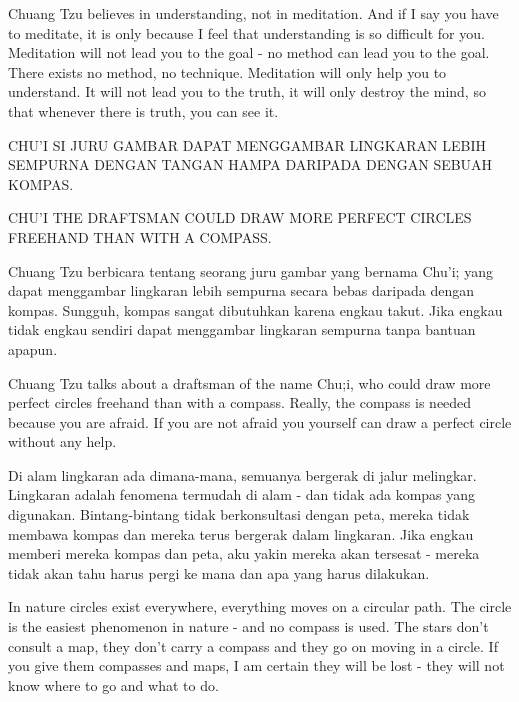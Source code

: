 \english
Chuang Tzu believes in understanding, not in meditation. And if I say you have to meditate, it is only because I feel that understanding is so difficult for you. Meditation will not lead you to the goal - no method can lead you to the goal. There exists no method, no technique. Meditation will only help you to understand. It will not lead you to the truth, it will only destroy the mind, so that whenever there is truth, you can see it.

\bahasa
CHU'I SI JURU GAMBAR DAPAT MENGGAMBAR LINGKARAN LEBIH SEMPURNA DENGAN TANGAN HAMPA DARIPADA DENGAN SEBUAH KOMPAS.

\english
CHU'I THE DRAFTSMAN COULD DRAW MORE PERFECT CIRCLES FREEHAND THAN WITH A COMPASS.

\bahasa
Chuang Tzu berbicara tentang seorang juru gambar yang bernama Chu'i; yang dapat menggambar lingkaran lebih sempurna secara bebas daripada dengan kompas. Sungguh, kompas sangat dibutuhkan karena engkau takut. Jika engkau tidak engkau sendiri dapat menggambar lingkaran sempurna tanpa bantuan apapun.

\english
Chuang Tzu talks about a draftsman of the name Chu;i, who could draw more perfect circles freehand than with a compass. Really, the compass is needed because you are afraid. If you are not afraid you yourself can draw a perfect circle without any help.

\bahasa
Di alam lingkaran ada dimana-mana, semuanya bergerak di jalur melingkar. Lingkaran adalah fenomena termudah di alam - dan tidak ada kompas yang digunakan. Bintang-bintang tidak berkonsultasi dengan peta, mereka tidak membawa kompas dan mereka terus bergerak dalam lingkaran. Jika engkau memberi mereka kompas dan peta, aku yakin mereka akan tersesat - mereka tidak akan tahu harus pergi ke mana dan apa yang harus dilakukan.

\english
In nature circles exist everywhere, everything moves on a circular path. The circle is the easiest phenomenon in nature - and no compass is used. The stars don't consult a map, they don't carry a compass and they go on moving in a circle. If you give them compasses and maps, I am certain they will be lost - they will not know where to go and what to do.




